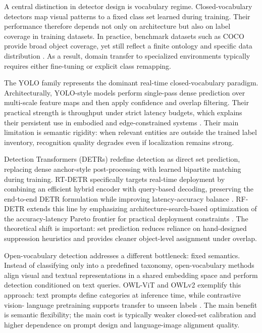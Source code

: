   A central distinction in detector design is vocabulary regime. Closed-vocabulary detectors map visual patterns to a fixed class set learned during training. Their performance therefore depends not only
  on architecture but also on label coverage in training datasets. In practice, benchmark datasets such as COCO provide broad object coverage, yet still reflect a finite ontology and specific data
  distribution \cite{lin2015microsoftcococommonobjects}. As a result, domain transfer to specialized environments typically requires either fine-tuning or explicit class remapping.

  The YOLO family represents the dominant real-time closed-vocabulary paradigm. Architecturally, YOLO-style models perform single-pass dense prediction over multi-scale feature maps and then apply
  confidence and overlap filtering. Their practical strength is throughput under strict latency budgets, which explains their persistent use in embodied and edge-constrained systems
  \cite{sapkota_ultralytics_2026}. Their main limitation is semantic rigidity: when relevant entities are outside the trained label inventory, recognition quality degrades even if localization remains
  strong.

  Detection Transformers (DETRs) redefine detection as direct set prediction, replacing dense anchor-style post-processing with learned bipartite matching during training. RT-DETR specifically targets
  real-time deployment by combining an efficient hybrid encoder with query-based decoding, preserving the end-to-end DETR formulation while improving latency-accuracy balance \cite{zhao_detrs_2024}. RF-
  DETR extends this line by emphasizing architecture-search-based optimization of the accuracy-latency Pareto frontier for practical deployment constraints \cite{robinson_rf-detr_2026}. The theoretical
  shift is important: set prediction reduces reliance on hand-designed suppression heuristics and provides cleaner object-level assignment under overlap.

  Open-vocabulary detection addresses a different bottleneck: fixed semantics. Instead of classifying only into a predefined taxonomy, open-vocabulary methods align visual and textual representations in
  a shared embedding space and perform detection conditioned on text queries. OWL-ViT and OWLv2 exemplify this approach: text prompts define categories at inference time, while contrastive vision-
  language pretraining supports transfer to unseen labels \cite{minderer_simple_2022,minderer_scaling_2024}. The main benefit is semantic flexibility; the main cost is typically weaker closed-set
  calibration and higher dependence on prompt design and language-image alignment quality.

